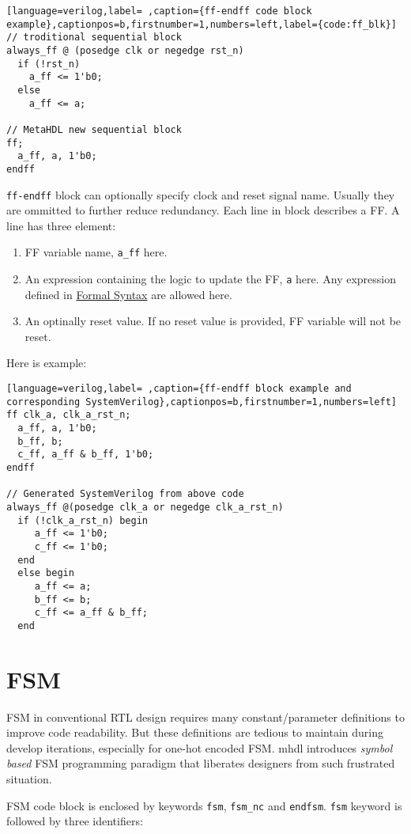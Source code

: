 \documentclass[10pt,oneside]{book}
\begin{document}
\begin{lstlisting}[language=verilog,label= ,caption={ff-endff code block example},captionpos=b,firstnumber=1,numbers=left,label={code:ff_blk}]
// troditional sequential block
always_ff @ (posedge clk or negedge rst_n) 
  if (!rst_n) 
    a_ff <= 1'b0; 
  else
    a_ff <= a;

// MetaHDL new sequential block
ff; 
  a_ff, a, 1'b0; 
endff
\end{lstlisting}


\texttt{ff-endff} block can optionally specify clock and reset signal name.
Usually they are ommitted to further reduce redundancy.  Each
line in block describes a FF.  A line has three element:

\begin{enumerate}
\item FF variable name, \texttt{a\_ff} here.
\item An expression containing the logic to update the FF, \texttt{a} here.  Any
expression defined in \hyperref[sec:orgbcbe461]{Formal Syntax} are allowed here.
\item An optinally reset value.  If no reset value is provided, FF
variable will not be reset.
\end{enumerate}

Here is example:
\begin{lstlisting}[language=verilog,label= ,caption={ff-endff block example and corresponding SystemVerilog},captionpos=b,firstnumber=1,numbers=left]
ff clk_a, clk_a_rst_n;
  a_ff, a, 1'b0;
  b_ff, b;
  c_ff, a_ff & b_ff, 1'b0;
endff

// Generated SystemVerilog from above code
always_ff @(posedge clk_a or negedge clk_a_rst_n)
  if (!clk_a_rst_n) begin
     a_ff <= 1'b0; 
     c_ff <= 1'b0; 
  end 
  else begin
     a_ff <= a; 
     b_ff <= b; 
     c_ff <= a_ff & b_ff; 
  end
\end{lstlisting}


\section{FSM}
\label{sec:orgac0159b}
FSM in conventional RTL design requires many constant/parameter
definitions to improve code readability.  But these definitions are
tedious to maintain during develop iterations, especially for one-hot
encoded FSM.  mhdl introduces \emph{symbol based} FSM programming paradigm
that liberates designers from such frustrated situation.

FSM code block is enclosed by keywords \texttt{fsm}, \texttt{fsm\_nc} and \texttt{endfsm}.
\texttt{fsm} keyword is followed by three identifiers:
\end{document}
